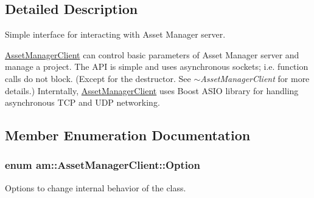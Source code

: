 \subsection{Detailed Description}
Simple interface for interacting with Asset Manager server. 

\hyperlink{classam_1_1_asset_manager_client}{AssetManagerClient} can control basic parameters of Asset Manager server and manage a project. The API is simple and uses asynchronous sockets; i.e. function calls do not block. (Except for the destructor. See {\itshape $\sim$AssetManagerClient\/} for more details.) Interntally, \hyperlink{classam_1_1_asset_manager_client}{AssetManagerClient} uses Boost ASIO library for handling asynchronous TCP and UDP networking. 

\subsection{Member Enumeration Documentation}
\hypertarget{classam_1_1_asset_manager_client_a46c830784e6b2983faa4764d1cad8204}{
\subsubsection[{Option}]{\setlength{\rightskip}{0pt plus 5cm}enum {\bf am::AssetManagerClient::Option}}}
\label{classam_1_1_asset_manager_client_a46c830784e6b2983faa4764d1cad8204}


Options to change internal behavior of the class. 

